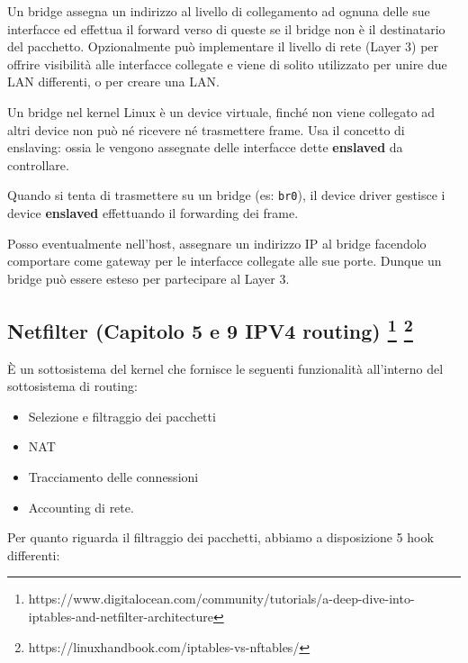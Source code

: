 Un bridge assegna un indirizzo al livello di collegamento ad ognuna
delle sue interfacce ed effettua il forward verso di queste se il bridge
non è il destinatario del pacchetto. Opzionalmente può implementare il
livello di rete (Layer 3) per offrire visibilità alle interfacce
collegate e viene di solito utilizzato per unire due LAN differenti, o
per creare una LAN.

Un bridge nel kernel Linux è un device virtuale, finché non viene
collegato ad altri device non può né ricevere né trasmettere frame. Usa
il concetto di enslaving: ossia le vengono assegnate delle interfacce
dette \textbf{enslaved} da controllare.

Quando si tenta di trasmettere su un bridge (es:
\passthrough{\lstinline!br0!}), il device driver gestisce i device
\textbf{enslaved} effettuando il forwarding dei frame.

Posso eventualmente nell'host, assegnare un indirizzo IP al bridge
facendolo comportare come gateway per le interfacce collegate alle sue
porte. Dunque un bridge può essere esteso per partecipare al Layer 3.

\subsection[Netfilter (Capitolo 5 e 9 IPV4 routing)
]{\texorpdfstring{Netfilter (Capitolo 5 e 9 IPV4 routing) \footnote{\label{fn:ref_25}https://www.digitalocean.com/community/tutorials/a-deep-dive-into-iptables-and-netfilter-architecture}
\footnote{\label{fn:ref_26}https://linuxhandbook.com/iptables-vs-nftables/}}{Netfilter (Capitolo 5 e 9 IPV4 routing)  }}\label{netfilter-capitolo-5-e-9-ipv4-routing-3-4}

È un sottosistema del kernel che fornisce le seguenti funzionalità
all'interno del sottosistema di routing:

\begin{itemize}
\tightlist
\item
  Selezione e filtraggio dei pacchetti
\item
  NAT
\item
  Tracciamento delle connessioni
\item
  Accounting di rete.
\end{itemize}

Per quanto riguarda il filtraggio dei pacchetti, abbiamo a disposizione
5 hook differenti:

